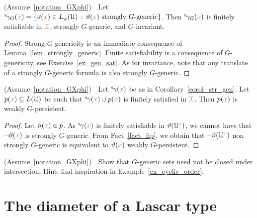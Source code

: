 \begin{corollary}\label{corol_str_gen}
  (Assume~\ref{notation_GXphi})\ \  
  Let ${}^{\rm s}\kern-.2ex\gamma_G({\color{brown} x})=\{\vartheta({\color{brown} x})\in L_\varphi(\EuScript U)\,:\, \vartheta({\color{brown} x})\textrm{ strongly $G$-generic}\}$.
  Then ${}^{\rm s}\kern-.2ex\gamma_G({\color{brown} x})$ is finitely satisfiable in ${\color{brown}\EuScript X}$, strongly $G$-generic, and $G$-invariant.
\end{corollary}

\begin{proof}
  Strong $G$-genericity is an immediate consequence of Lemma~\ref{lem_strongly_generic}.
  Finite satisfiability is a consequence of $G$-genericity, see Exercise~\ref{ex_gen_sat}.
  As for invariance, note that any translate of a strongly $G$-generic formula is also strongly $G$-generic.
\end{proof}

\begin{corollary}\label{corol_q_w_pers}
  (Assume~\ref{notation_GXphi})\ \  
  Let ${}^{\rm s}\kern-.2ex\gamma({\color{brown} x})$ be as in Corollary~\ref{corol_str_gen}.
  Let $p({\color{brown} x})\subseteq L(\EuScript U)$ be such that ${}^{\rm s}\kern-.2ex\gamma({\color{brown} x})\cup p({\color{brown} x})$ is finitely satisfied in ${\color{brown}\EuScript X}$.
  Then $p({\color{brown} x})$ is weakly $G$-persistent.
\end{corollary}

\begin{proof}
  Let $\vartheta({\color{brown} x})\in p$.
  As ${}^{\rm s}\kern-.2ex\gamma({\color{brown} x})$ is finitely satisfiable in $\vartheta(\EuScript U^{\color{brown} x})$, we cannot have that $\neg\vartheta({\color{brown} x})$ is strongly $G$-generic.
  From Fact~\ref{fact_fip}, we obtain that $\neg\vartheta(\EuScript U^{\color{brown} x})$ non strongly $G$-generic is equivalent to $\vartheta({\color{brown} x})$ weakly $G$-persistent.
\end{proof}

\begin{exercise}
  (Assume~\ref{notation_GXphi})\ \  
  Show that $G$-generic sets need not be closed under intersection.
  Hint: find inspiration in Example~\ref{ex_cyclic_order}.
\end{exercise}


\section{The diameter of a Lascar type}\label{newelski}

